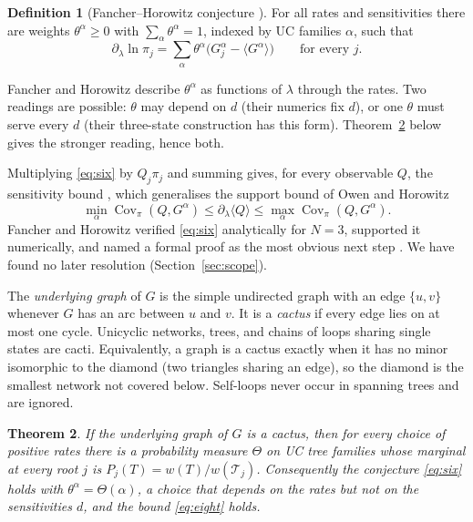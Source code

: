 \documentclass[11pt]{amsart}
\newtheorem{theorem}{Theorem}[section]
\theoremstyle{definition}
\newtheorem{definition}[theorem]{Definition}
\theoremstyle{remark}
\newcommand{\T}{\mathcal T}
\begin{document}
\begin{definition}[Fancher--Horowitz conjecture {\cite[Eq.~(6)]{FH2026}}]
For all rates and sensitivities there are weights $\theta^\alpha\ge0$ with $\sum_\alpha\theta^\alpha=1$, indexed by UC families $\alpha$, such that
\begin{equation}\label{eq:six}
 \partial_\lambda\ln\pi_j=\sum_\alpha\theta^\alpha\bigl(G^\alpha_j-\langle G^\alpha\rangle\bigr)\qquad\text{for every }j.
\end{equation}
\end{definition}

Fancher and Horowitz describe $\theta^\alpha$ as functions of $\lambda$ through the rates. Two readings are possible: $\theta$ may depend on $d$ (their numerics fix $d$), or one $\theta$ must serve every $d$ (their three-state construction has this form). Theorem~\ref{thm:main} below gives the stronger reading, hence both.

Multiplying \eqref{eq:six} by $Q_j\pi_j$ and summing gives, for every observable $Q$, the sensitivity bound \cite[Eq.~(8)]{FH2026}, which generalises the support bound of Owen and Horowitz \cite{OwenHorowitz2023}
\begin{equation}\label{eq:eight}
 \min_\alpha \operatorname{Cov}_\pi(Q,G^\alpha)\le\partial_\lambda\langle Q\rangle\le\max_\alpha\operatorname{Cov}_\pi(Q,G^\alpha).
\end{equation}
Fancher and Horowitz verified \eqref{eq:six} analytically for $N=3$, supported it numerically, and named a formal proof as the most obvious next step \cite{FH2026}. We have found no later resolution (Section~\ref{sec:scope}).

The \emph{underlying graph} of $G$ is the simple undirected graph with an edge $\{u,v\}$ whenever $G$ has an arc between $u$ and $v$. It is a \emph{cactus} if every edge lies on at most one cycle. Unicyclic networks, trees, and chains of loops sharing single states are cacti. Equivalently, a graph is a cactus exactly when it has no minor isomorphic to the diamond (two triangles sharing an edge), so the diamond is the smallest network not covered below. Self-loops never occur in spanning trees and are ignored.

\begin{theorem}\label{thm:main}
If the underlying graph of $G$ is a cactus, then for every choice of positive rates there is a probability measure $\Theta$ on UC tree families whose marginal at every root $j$ is $P_j(T)=w(T)/w(\T_j)$. Consequently the conjecture \eqref{eq:six} holds with $\theta^\alpha=\Theta(\alpha)$, a choice that depends on the rates but not on the sensitivities $d$, and the bound \eqref{eq:eight} holds.
\end{theorem}
\end{document}
